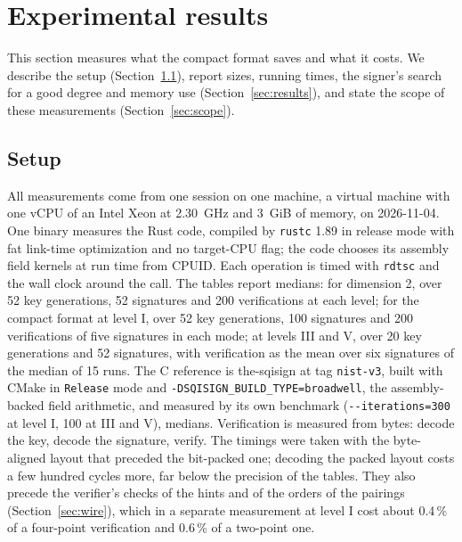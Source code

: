 \documentclass[version=preprint]{iacrcc}
\begin{document}
    \section{Experimental results}
    \label{sec:bench}

    This section measures what the compact format saves and what it costs. We
    describe the setup (Section~\ref{sec:setup}), report sizes, running times,
    the signer's search for a good degree and memory use
    (Section~\ref{sec:results}), and state the scope of these measurements
    (Section~\ref{sec:scope}).

    \subsection{Setup}
    \label{sec:setup}
    All measurements come from one session on one machine, a virtual machine
    with one vCPU of an Intel Xeon at 2.30~GHz and 3~GiB of memory, on
    2026-11-04. One binary measures the Rust code, compiled by \texttt{rustc}
    1.89 in release mode with fat link-time optimization and no target-CPU
    flag; the code chooses its assembly field kernels at run time from CPUID.
    Each operation is timed with \texttt{rdtsc} and the wall clock around the
    call. The tables report medians: for dimension 2, over 52 key generations,
    52 signatures and 200 verifications at each level; for the compact format
    at level I, over 52 key generations, 100 signatures and 200 verifications
    of five signatures in each mode; at levels III and V, over 20 key
    generations and 52 signatures, with verification as the mean over six
    signatures of the median of 15 runs. The C reference is the-sqisign at tag
    \texttt{nist-v3}, built with CMake in \texttt{Release} mode and
    \texttt{-DSQISIGN\_BUILD\_TYPE=broadwell}, the assembly-backed field
    arithmetic, and measured by its own benchmark
    (\texttt{-{}-iterations=300} at level I, 100 at III and V), medians.
    Verification is measured from bytes: decode the key, decode the signature,
    verify. The timings were taken with the byte-aligned layout that preceded
    the bit-packed one; decoding the packed layout costs a few hundred cycles
    more, far below the precision of the tables. They also precede the verifier's checks of the hints and of the
    orders of the pairings (Section~\ref{sec:wire}), which in a separate
    measurement at level I cost about 0.4\,\% of a four-point verification and
    0.6\,\% of a two-point one.
\end{document}
